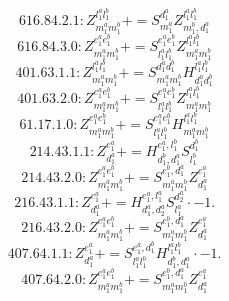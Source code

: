 \documentclass[letterpaper,10pt,fleqn,leqno,onecolumn]{article}
\begin{document}
\begin{equation} \;\;\;\;\;\;  616.84.2.1: Z^{l_{1}^{a}l_{1}^{b}}_{m_{1}^{a}m_{1}^{b}}+=S^{d_{1}^{a}}_{m_{1}^{a}}Z^{l_{1}^{a}l_{1}^{b}}_{m_{1}^{b},d_{1}^{a}} \end{equation}
\begin{equation} \;\;\;\;\;\;  616.84.3.0: Z^{e_{1}^{a}e_{1}^{b}}_{m_{1}^{a}m_{1}^{b}}+=S^{e_{1}^{a}e_{1}^{b}}_{l_{1}^{a}l_{1}^{b}}Z^{l_{1}^{a}l_{1}^{b}}_{m_{1}^{a}m_{1}^{b}} \end{equation}
\begin{equation} \;\;\;\;\;\;  401.63.1.1: Z^{l_{1}^{a}l_{1}^{b}}_{m_{1}^{a}m_{1}^{b}}+=S^{d_{1}^{a}d_{1}^{b}}_{m_{1}^{a}m_{1}^{b}}H^{l_{1}^{a}l_{1}^{b}}_{d_{1}^{a}d_{1}^{b}} \end{equation}
\begin{equation} \;\;\;\;\;\;  401.63.2.0: Z^{e_{1}^{a}e_{1}^{b}}_{m_{1}^{a}m_{1}^{b}}+=S^{e_{1}^{a}e_{1}^{b}}_{l_{1}^{a}l_{1}^{b}}Z^{l_{1}^{a}l_{1}^{b}}_{m_{1}^{a}m_{1}^{b}} \end{equation}
\begin{equation} \;\;\;\;\;\;  61.17.1.0: Z^{e_{1}^{a}e_{1}^{b}}_{m_{1}^{a}m_{1}^{b}}+=S^{e_{1}^{a}e_{1}^{b}}_{l_{1}^{a}l_{1}^{b}}H^{l_{1}^{a}l_{1}^{b}}_{m_{1}^{a}m_{1}^{b}} \end{equation}
\begin{equation} \;\;\;\;\;\;  214.43.1.1: Z^{e_{1}^{a}}_{d_{1}^{a}}+=H^{e_{1}^{a},l_{1}^{b}}_{d_{1}^{b},d_{1}^{a}}S^{d_{1}^{b}}_{l_{1}^{b}} \end{equation}
\begin{equation} \;\;\;\;\;\;  214.43.2.0: Z^{e_{1}^{a}e_{1}^{b}}_{m_{1}^{a}m_{1}^{b}}+=S^{e_{1}^{b},d_{1}^{a}}_{m_{1}^{a}m_{1}^{b}}Z^{e_{1}^{a}}_{d_{1}^{a}} \end{equation}
\begin{equation} \;\;\;\;\;\;  216.43.1.1: Z^{e_{1}^{a}}_{d_{1}^{a}}+=H^{e_{1}^{a},l_{1}^{a}}_{d_{1}^{a},d_{2}^{a}}S^{d_{2}^{a}}_{l_{1}^{a}}\cdot -1. \end{equation}
\begin{equation} \;\;\;\;\;\;  216.43.2.0: Z^{e_{1}^{a}e_{1}^{b}}_{m_{1}^{a}m_{1}^{b}}+=S^{e_{1}^{b},d_{1}^{a}}_{m_{1}^{a}m_{1}^{b}}Z^{e_{1}^{a}}_{d_{1}^{a}} \end{equation}
\begin{equation} \;\;\;\;\;\;  407.64.1.1: Z^{e_{1}^{a}}_{d_{1}^{a}}+=S^{e_{1}^{a},d_{1}^{b}}_{l_{1}^{a}l_{1}^{b}}H^{l_{1}^{a}l_{1}^{b}}_{d_{1}^{b},d_{1}^{a}}\cdot -1. \end{equation}
\begin{equation} \;\;\;\;\;\;  407.64.2.0: Z^{e_{1}^{a}e_{1}^{b}}_{m_{1}^{a}m_{1}^{b}}+=S^{e_{1}^{b},d_{1}^{a}}_{m_{1}^{a}m_{1}^{b}}Z^{e_{1}^{a}}_{d_{1}^{a}} \end{equation}
\end{document}
